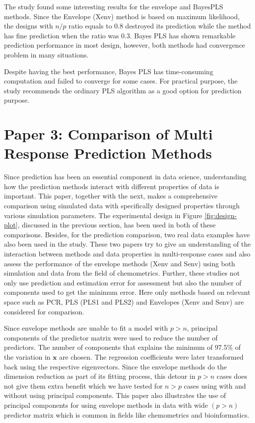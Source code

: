 \documentclass[11pt,twoside,openright,titlepage,
  headinclude,footinclude,BCOR=5mm,
  numbers=noenddot,cleardoublepage=empty,
  tablecaptionabove, dottedtoc,
  bibliography=totoc,paper=a4]{scrreprt}
\begin{document}
The study found some interesting results for the envelope and BayesPLS methods. Since the Envelope (Xenv) method is based on maximum likelihood, the designs with \(n/p\) ratio equals to 0.8 destroyed its prediction while the method has fine prediction when the ratio was 0.3. Bayes PLS has shown remarkable prediction performance in most design, however, both methods had convergence problem in many situations.

Despite having the best performance, Bayes PLS has time-consuming computation and failed to converge for some cases. For practical purpose, the study recommends the ordinary PLS algorithm as a good option for prediction purpose.

\hypertarget{paper-3-comparison-of-multi-response-prediction-methods}{%
\section{Paper 3: Comparison of Multi Response Prediction Methods}\label{paper-3-comparison-of-multi-response-prediction-methods}}

Since prediction has been an essential component in data science, understanding how the prediction methods interact with different properties of data is important. This paper, together with the next, makes a comprehensive comparison using simulated data with specifically designed properties through various simulation parameters. The experimental design in Figure \ref{fig:design-plot}, discussed in the previous section, has been used in both of these comparisons. Besides, for the prediction comparison, two real data examples have also been used in the study. These two papers try to give an understanding of the interaction between methods and data properties in multi-response cases and also assess the performance of the envelope methods (Xenv and Senv) using both simulation and data from the field of chemometrics. Further, these studies not only use prediction and estimation error for assessment but also the number of components used to get the minimum error. Here only methods based on relevant space such as PCR, PLS (PLS1 and PLS2) and Envelopes (Xenv and Senv) are considered for comparison.

Since envelope methods are unable to fit a model with \(p>n\), principal components of the predictor matrix were used to reduce the number of predictors. The number of components that explains the minimum of 97.5\% of the variation in \(\mathbf{x}\) are chosen. The regression coefficients were later transformed back using the respective eigenvectors. Since the envelope methods do the dimension reduction as part of its fitting process, this detour in \(p>n\) cases does not give them extra benefit which we have tested for \(n>p\) cases using with and without using principal components. This paper also illustrates the use of principal components for using envelope methods in data with wide \((p>n)\) predictor matrix which is common in fields like chemometrics and bioinformatics.
\end{document}
